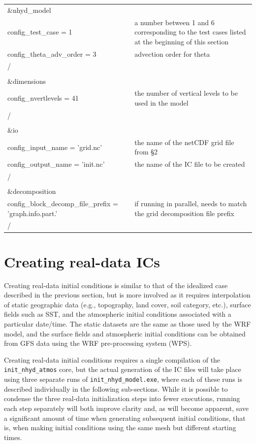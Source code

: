 \documentclass[11pt]{report}
\begin{document}
\begin{longtable}{p{3in}|p{3.25in}}

\&nhyd\_model\\
   config\_test\_case       = 1                      & a number between 1 and 6 corresponding to the test cases listed at the beginning of this section\\
   config\_theta\_adv\_order = 3                     & advection order for theta \\
/\\
\\
\&dimensions\\
   config\_nvertlevels     = 41                      & the number of vertical levels to be used in the model \\
/\\
\\
\&io\\
   config\_input\_name         = 'grid.nc'           & the name of the netCDF grid file from \S2 \\
   config\_output\_name        = 'init.nc'           & the name of the IC file to be created \\
/\\
\\
\&decomposition\\
   config\_block\_decomp\_file\_prefix = 'graph.info.part.' & if running in parallel, needs to match the grid decomposition file prefix \\
/\\

\end{longtable}



\section{Creating real-data ICs}

Creating real-data initial conditions is similar to that of the idealized case described in the previous section, but is more involved as it requires interpolation of static geographic data (e.g., topography, land cover, soil category, etc.), surface fields such as SST, and the atmospheric initial conditions associated with a particular date/time.  The static datasets are the same as those used by the WRF model, and the surface fields and atmospheric initial conditions can be obtained from GFS data using the WRF pre-processing system (WPS).

Creating real-data initial conditions requires a single compilation of the {\tt init\_nhyd\_atmos} core, but the actual generation of the IC files will take place using three separate runs of {\tt init\_nhyd\_model.exe}, where each of these runs is described individually in the following sub-sections.  While it is possible to condense the three real-data initialization steps into fewer executions, running each step separately will both improve clarity and, as will become apparent, save a significant amount of time when generating subsequent initial conditions, that is, when making initial conditions using the same mesh but different starting times.
\end{document}
